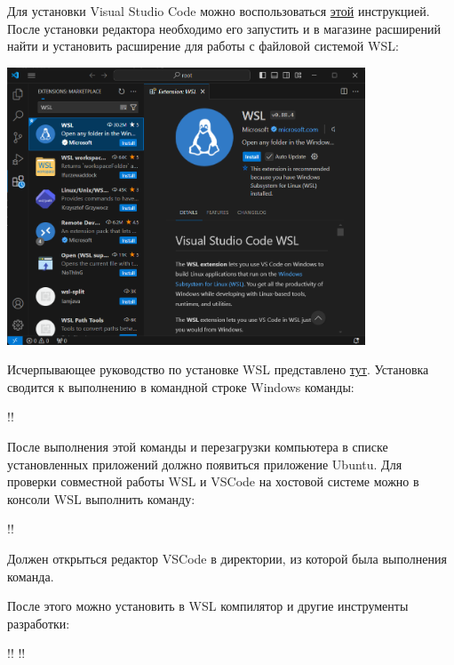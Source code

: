 \documentclass[14pt]{extarticle}
\begin{document}
Для установки Visual Studio Code можно воспользоваться
\href{https://code.visualstudio.com/docs/setup/windows#_installation}{этой}
инструкцией.
После установки редактора необходимо его запустить и в магазине расширений найти и установить
расширение для работы с файловой системой WSL:

\begin{center}
    \includegraphics[width=0.8\textwidth]{Homeworks/1-Hello-World/wsl-extension.png}
\end{center}

Исчерпывающее руководство по установке WSL представлено
\href{https://learn.microsoft.com/ru-ru/windows/wsl/setup/environment}{тут}.
Установка сводится к выполнению в командной строке Windows команды:

\begin{consolewindow}
!!
\end{consolewindow}

После выполнения этой команды и перезагрузки компьютера в списке установленных приложений
должно появиться приложение Ubuntu.
Для проверки совместной работы WSL и VSCode на хостовой системе можно в консоли WSL выполнить
команду:

\begin{consolewindow}
!!
\end{consolewindow}

Должен открыться редактор VSCode в директории, из которой была выполнения команда.

После этого можно установить в WSL компилятор и другие инструменты разработки:

\begin{consolewindow}
!!
!!
\end{consolewindow}
\end{document}
